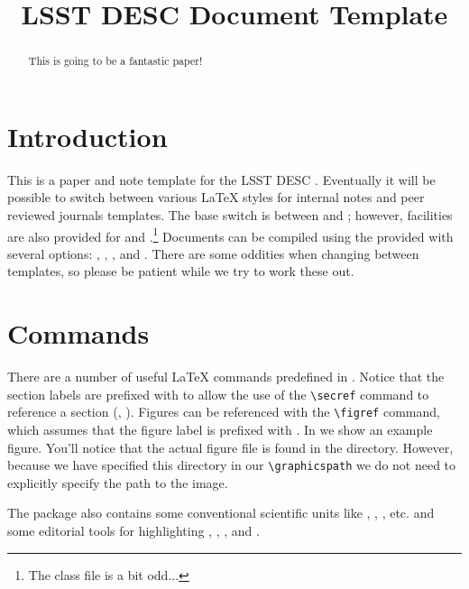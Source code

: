 \documentclass[\docopts]{\docclass}
\begin{document}
\title{LSST DESC Document Template}

\maketitlepre

\begin{abstract}

This is going to be a fantastic paper!

\end{abstract}

\maketitlepost

\section{Introduction}
\label{sec:intro}

This is a paper and note template for the LSST DESC \citep{Overview,ScienceBook,WhitePaper}.
Eventually it will be possible to switch between various \LaTeX\xspace styles for internal notes and peer reviewed journals templates.
The base switch is between  and ; however, facilities are also provided for  and .\footnote{The  class file is a bit odd...}
Documents can be compiled using the provided  with several options: , , , and .
There are some oddities when changing between templates, so please be patient while we try to work these out.

\section{Commands}
\label{sec:commands}

There are a number of useful \LaTeX\xspace commands predefined in .
Notice that the section labels are prefixed with  to allow the use of the \verb=\secref= command to reference a section (\ie, ).
Figures can be referenced with the \verb=\figref= command, which assumes that the figure label is prefixed with .
In  we show an example figure.
You'll notice that the actual figure file is found in the  directory.
However, because we have specified this directory in our \verb=\graphicspath= we do not need to explicitly specify the path to the image.

The  package also contains some conventional scientific units like \angstrom, \GeV, \Msun, etc. and some editorial tools for highlighting , , , and .
\end{document}
